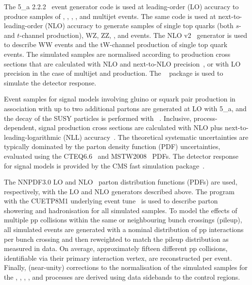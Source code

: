 The {\MADGRAPH{}5\_a\MCATNLO} 2.2.2~\cite{Alwall2014} event generator
code is used at leading-order (LO) accuracy to produce samples of \wj,
\zj, \gj, \ttbar, and multijet events. The same code is used at
next-to-leading-order (NLO) accuracy to generate samples of single top
quarks (both $s$- and $t$-channel production), WZ, ZZ, \ttw, and \ttz
events. The NLO \POWHEG v2~\cite{powheg, powheg_top_Wt} generator is
used to describe WW events and the tW-channel production of single top
quark events. The simulated samples are normalised according to
production cross sections that are calculated with NLO and next-to-NLO
precision~\cite{Alwall2014, wphys, fewz, wwxs, top++, nlotop,
  powheg_top_Wt}, or with LO precision in the case of multijet and \gj
production.  The \GEANTfour~\cite{geant} package is used to simulate
the detector response.

{
Event samples for signal models involving gluino or squark pair
production in association with up to two additional partons are
generated at LO with {\MADGRAPH{}5\_a\MCATNLO}, and the
decay of the SUSY particles is performed with ~\cite{pythia}. Inclusive, process-dependent, signal production
cross sections are calculated with NLO plus
next-to-leading-logarithmic (NLL) accuracy~\cite{Beenakker:1996ch,
  PhysRevLett.102.111802, PhysRevD.80.095004, 1126-6708-2009-12-041,
  doi:10.1142/S0217751X11053560, susynlo}. The theoretical systematic
uncertainties are typically dominated by the parton density function
(PDF) uncertainties, evaluated using the
CTEQ6.6~\cite{Nadolsky:2008zw} and MSTW2008~\cite{Martin:2009iq} PDFs.
The detector response for signal models is provided by the CMS fast
simulation package~\cite{fastsim}.
\par}


The {NNPDF}3.0 LO and NLO~\cite{nnpdf} parton distribution
functions (PDFs) are used, respectively, with the LO and NLO
generators described above. The \PYTHIA program with the
CUETP8M1 underlying event tune~\cite{Khachatryan:2015pea} is used
to describe parton showering and hadronisation for all simulated
samples. To model the effects of multiple pp collisions within the
same or neighbouring bunch crossings (pileup), all simulated events
are generated with a nominal distribution of pp interactions per bunch
crossing and then reweighted to match the pileup distribution as
measured in data. On average, approximately fifteen different pp
collisions, identifiable via their primary interaction vertex, are
reconstructed per event. Finally, (near-unity) corrections to the
normalisation of the simulated samples for the \gj, \wmj, \ttbar,
\zmumuj, and \znunuj processes are derived using data sidebands to the
control regions.

